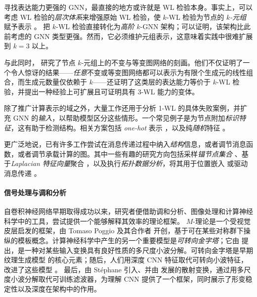 寻找表达能力更强的 GNN，最直接的地方或许就是 WL 检验本身。事实上，可以考虑 WL 检验的\emph{层次体系}来增强原始 WL 检验，使 $k$-WL 检验为节点的 $k$\emph{-元组}赋予表示 \citep{morris2017glocalized}。\citet{morris2019weisfeiler} 把 $k$-WL 检验直接转化为\emph{高阶} $k$-GNN 架构；可以证明，该架构比此前考虑的 GNN 类型更强。然而，它必须维护元组表示，这意味着实践中很难扩展到 $k=3$ 以上。

与此同时，\citet{maron2018invariant,maron2019provably} 研究了节点 $k$-元组上的不变与等变图网络的刻画。他们不仅证明了一个令人惊讶的结果——\emph{任意}不变或等变图网络都可以表示为有限个生成元的线性组合，而生成元数量仅依赖于 $k$——还证明了这类层的表达能力等价于 $k$-WL 检验，并提出一种经验上可扩展且可证明具有 3-WL 能力的变体。

除了推广计算表示的域之外，大量工作还用于分析 1-WL 的具体失败案例，并扩充 GNN 的\emph{输入}，以帮助模型区分这些情形。一个常见例子是为节点附加\emph{标识特征}，这有助于检测结构。相关方案包括 \emph{one-hot} 表示 \citep{murphy2019relational}，以及纯\emph{随机}特征 \citep{sato2020random}。

更广泛地说，已有许多工作尝试在消息传递过程中纳入\emph{结构}信息，或者调节消息函数，或者调节承载计算的图。其中一些有趣的研究方向包括采样\emph{锚节点集合} \citep{you2019position}、基于\emph{Laplacian 特征向量}聚合 \citep{stachenfeld2020graph,beaini2020directional,dwivedi2020generalization}，以及执行\emph{拓扑数据分析}，将其用于位置嵌入 \citep{bouritsas2020improving} 或驱动消息传递 \citep{bodnar2021weisfeiler}。

 

\paragraph{信号处理与调和分析}
自卷积神经网络早期取得成功以来，研究者便借助调和分析、图像处理和计算神经科学中的工具，尝试提供一个能够解释其效率的理论框架。
$M$-理论是一个受视觉皮层启发的框架，由 Tomaso Poggio 及其合作者 \citep{riesenhuber1999hierarchical, serre2007feedforward} 开创，基于可在某些对称群下操纵的模板概念。计算神经科学中产生的另一个重要模型是\emph{可转向金字塔}；它由 \cite{simoncelli1995steerable} 提出，是一种对某些输入变换具有良好性质的多尺度小波分解。可转向金字塔是早期纹理生成模型 \citep{portilla2000parametric} 的核心元素；随后，人们用深度 CNN 特征取代可转向小波特征，改进了这些模型 \cite{gatys2015texture}。
最后，由 St{\'e}phane \cite{mallat2012group} 引入、并由 \cite{bruna2013invariant} 发展的散射变换，通过用多尺度小波分解取代可训练滤波器，为理解 CNN 提供了一个框架，同时展示了形变稳定性以及深度在架构中的作用。


